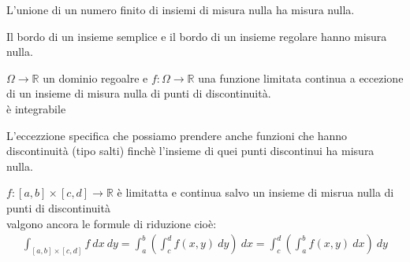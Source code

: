 \documentclass[a4paper, oneside]{article}
\begin{document}
\begin{proposition}
    L'unione di un numero finito di insiemi di misura nulla ha misura nulla.
\end{proposition}


\begin{corollary}
    Il bordo di un insieme semplice e il bordo di un insieme regolare hanno misura nulla.
\end{corollary}


\begin{theorem}
     $\Omega \to \mathbb{R}$ un dominio regoalre e $f:\Omega \to \mathbb{R}$ una funzione limitata continua a eccezione di un insieme di misura nulla di punti di discontinuità.\\
     è integrabile
\end{theorem}


\begin{aside}
    L'eccezzione specifica che possiamo prendere anche funzioni che hanno discontinuità (tipo salti) finchè l'insieme di quei punti discontinui ha misura nulla.
\end{aside}


\begin{theorem}
     $f:[a,b] \times [c,d] \to \mathbb{R}$ è limitatta e continua salvo un insieme di misrua nulla di punti di discontinuità\\
     valgono ancora le formule di riduzione cioè:
    \begin{gather*}
        \int_{[a,b]\times[c,d]} f \ dx \ dy = \int_{a}^{b} \left( \int_{c}^{d} f(x,y) \ dy \right) \ dx = \int_{c}^{d} \left( \int_{a}^{b} f(x,y) \ dx \right) \ dy  
    \end{gather*}
\end{theorem}
\end{document}
